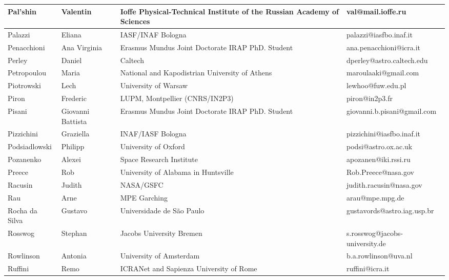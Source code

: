 \begin{center}
\begin{longtable}{|p{1.28cm} |p{1.28cm} |p{2.9cm} |p{3cm} |}
\tiny Pal'shin &\tiny Valentin & \tiny Ioffe Physical-Technical Institute of the Russian Academy of Sciences & \tiny val@mail.ioffe.ru \\ \hline
\tiny Palazzi &\tiny Eliana & \tiny IASF/INAF Bologna & \tiny palazzi@iasfbo.inaf.it \\ \hline
\tiny Penacchioni &\tiny Ana Virginia & \tiny Erasmus Mundus Joint Doctorate IRAP PhD. Student & \tiny ana.penacchioni@icra.it \\ \hline
\tiny Perley &\tiny Daniel & \tiny Caltech & \tiny dperley@astro.caltech.edu \\ \hline
\tiny Petropoulou &\tiny Maria & \tiny National and Kapodistrian University of Athens & \tiny maroulaaki@gmail.com \\ \hline
\tiny Piotrowski &\tiny Lech & \tiny University of Warsaw & \tiny lewhoo@fuw.edu.pl \\ \hline
\tiny Piron &\tiny Frederic & \tiny LUPM, Montpellier (CNRS/IN2P3) & \tiny piron@in2p3.fr \\ \hline
\tiny Pisani &\tiny Giovanni Battista & \tiny Erasmus Mundus Joint Doctorate IRAP PhD. Student & \tiny giovanni.b.pisani@gmail.com \\ \hline
\tiny Pizzichini &\tiny Graziella & \tiny INAF/IASF Bologna & \tiny pizzichini@iasfbo.inaf.it \\ \hline
\tiny Podsiadlowski &\tiny Philipp & \tiny University of Oxford & \tiny podsi@astro.ox.ac.uk \\ \hline
\tiny Pozanenko &\tiny Alexei & \tiny Space Research Institute & \tiny apozanen@iki.rssi.ru \\ \hline
\tiny Preece &\tiny Rob & \tiny University of Alabama in Huntsville & \tiny Rob.Preece@nasa.gov \\ \hline
\tiny Racusin &\tiny Judith & \tiny NASA/GSFC & \tiny judith.racusin@nasa.gov \\ \hline
\tiny Rau &\tiny Arne & \tiny MPE Garching & \tiny arau@mpe.mpg.de \\ \hline
\tiny Rocha da Silva &\tiny Gustavo & \tiny Universidade de S\~{a}o Paulo & \tiny gustavords@astro.iag.usp.br \\ \hline
\tiny Rosswog &\tiny Stephan & \tiny Jacobs University Bremen & \tiny s.rosswog@jacobs-university.de \\ \hline
\tiny Rowlinson &\tiny Antonia & \tiny University of Amsterdam & \tiny b.a.rowlinson@uva.nl \\ \hline
\tiny Ruffini &\tiny Remo & \tiny ICRANet and Sapienza University of Rome & \tiny ruffini@icra.it \\ \hline

\end{longtable}
\end{center}
